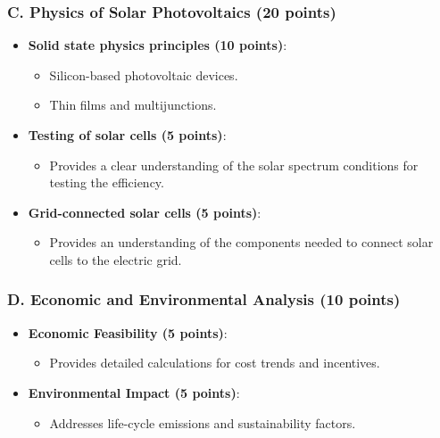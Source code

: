 \documentclass[11pt]{article}
\begin{document}
\subsubsection*{C. Physics of Solar Photovoltaics (20 points)}
\begin{itemize}
    \item \textbf{Solid state physics principles (10 points)}:
    \begin{itemize}
        \item Silicon-based photovoltaic devices.
        \item Thin films and multijunctions.
    \end{itemize}
    \item \textbf{Testing of solar cells (5 points)}:
    \begin{itemize}
        \item Provides a clear understanding of the solar spectrum conditions for testing the efficiency.
    \end{itemize}
    \item \textbf{Grid-connected solar cells (5 points)}:
    \begin{itemize}
        \item Provides an understanding of the components needed to connect solar cells to the electric grid.
    \end{itemize}
\end{itemize}

\subsubsection*{D. Economic and Environmental Analysis (10 points)}
\begin{itemize}
    \item \textbf{Economic Feasibility (5 points)}:
    \begin{itemize}
        \item Provides detailed calculations for cost trends and incentives.
    \end{itemize}
    \item \textbf{Environmental Impact (5 points)}:
    \begin{itemize}
        \item Addresses life-cycle emissions and sustainability factors.
    \end{itemize}
\end{itemize}
\end{document}
